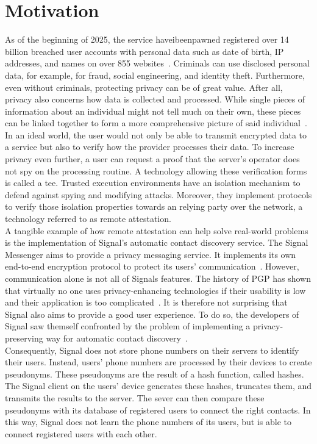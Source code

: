 \section{Motivation}
\label{sec:10:motivation}
As of the beginning of 2025, the service haveibeenpawned registered over 14
billion breached user accounts with personal data such as date of birth, IP
addresses, and names on over 855 websites~\cite{haveibeenpawned}. Criminals can
use disclosed personal data, for example, for fraud, social engineering, and
identity theft. Furthermore, even without criminals, protecting privacy can be
of great value. After all, privacy also concerns how data is collected and
processed. While single pieces of information about an individual might not tell
much on their own, these pieces can be linked together to form a more
comprehensive picture of said individual~\cite{solove2007ve}. In an ideal world,
the user would not only be able to transmit encrypted data to a service but also
to verify how the provider processes their data. To increase privacy even
further, a user can request a proof that the server's operator does not spy on
the processing routine. A technology allowing these verification forms is called
a \gls{tee}. Trusted execution environments have an isolation mechanism to
defend against spying and modifying attacks. Moreover, they implement protocols
to verify those isolation properties towards an relying party over the network,
a technology referred to as remote attestation. \\

A tangible example of how remote attestation can help solve real-world problems
is the implementation of Signal's automatic contact discovery service. The
Signal Messenger aims to provide a privacy messaging service. It implements its
own end-to-end encryption protocol to protect its users'
communication~\cite{cohn2020formal}. However, communication alone is not all of
Signals features. The history of PGP has shown that virtually no one uses
privacy-enhancing technologies if their usability is low and their application
is too complicated~\cite{ruoti2015johnny}. It is therefore not surprising that
Signal also aims to provide a good user experience. To do so, the developers of
Signal saw themself confronted by the problem of implementing a
privacy-preserving way for automatic contact discovery~\cite{SignalCd}.\\

Consequently, Signal does not store phone numbers on their servers to identify
their users. Instead, users' phone numbers are processed by their devices to
create pseudonyms. These pseudonyms are the result of a hash function, called
hashes. The Signal client on the users' device generates these hashes, truncates
them, and transmits the results to the server. The sever can then compare these
pseudonyms with its database of registered users to connect the right contacts.
In this way, Signal does not learn the phone numbers of its users, but is able
to connect registered users with each other.\\

